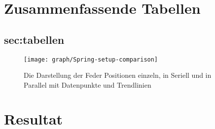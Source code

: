 \documentclass[../main.tex]{subfiles} %
\begin{document}
\section{Zusammenfassende Tabellen}\label{sec:zusammenfassende-tabellen}
    \subsection{sec:tabellen}\label{subsec:tabellen}
    \begin{figure}[H]
        \centering
        \texttt{[image: graph/Spring-setup-comparison]}
        \caption{Die Darstellung der Feder Positionen einzeln, in Seriell und in Parallel mit Datenpunkte und Trendlinien}
        \label{fig:graph-spring-setup-comparisons}
    \end{figure}
    \section{Resultat}\label{sec:resultat}
\end{document}
